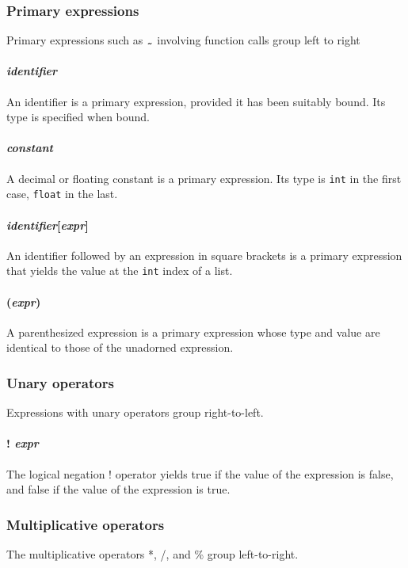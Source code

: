 \subsubsection{Primary expressions}
Primary expressions such as $\midtilde$ involving function calls group left to right

\paragraph{\textit{identifier}}
An identifier is a primary expression, provided it has been suitably bound. Its type is specified when bound. 

\paragraph{\textit{constant}}
A decimal or floating constant is a primary expression. Its type is \texttt{int} in the first case, \texttt{float} in the last. 

\paragraph{\textit{identifier}[\textit{expr}]}
An identifier followed by an expression in square brackets is a primary expression that yields the value at the \texttt{int}  index of a list.

\paragraph{(\textit{expr})}
A parenthesized expression is a primary expression whose type and value are identical to those of the unadorned expression. 

\subsubsection{Unary operators}
Expressions with unary operators group right-to-left.

\paragraph{! \textit{expr}}
The logical negation ! operator yields true if the value of the expression is false, and false if the value of the expression is true. 

\subsubsection{Multiplicative operators}
The multiplicative operators *, /, and \% group left-to-right.

